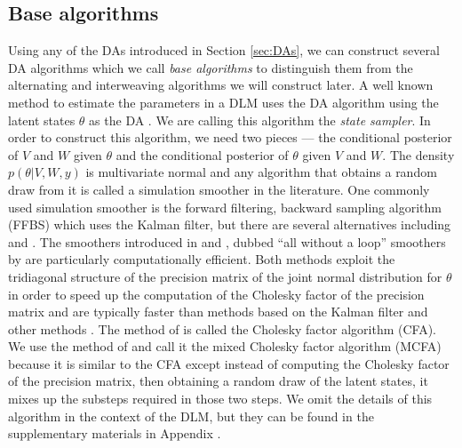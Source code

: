 \documentclass[12pt]{article}
\begin{document}
\subsection{Base algorithms}\label{sec:Algs:base}
Using any of the DAs introduced in Section \ref{sec:DAs}, we can construct several DA algorithms which we call {\it base algorithms} to distinguish them from the alternating and interweaving algorithms we will construct later. A well known method to estimate the parameters in a DLM uses the DA algorithm using the latent states $\theta$ as the DA \cite{fruhwirth1994data,carter1994gibbs}. We are calling this algorithm the {\it state sampler}. In order to construct this algorithm, we need two pieces --- the conditional posterior of $V$ and $W$ given $\theta$ and the conditional posterior of $\theta$ given $V$ and $W$. The density $p(\theta|V,W,y)$ is multivariate normal and any algorithm that obtains a random draw from it is called a simulation smoother in the literature. One commonly used simulation smoother is the forward filtering, backward sampling algorithm (FFBS) \cite{fruhwirth1994data,carter1994gibbs} which uses the Kalman filter, but there are several alternatives including \citet{koopman1993disturbance} and \citet{de1995simulation}. The smoothers introduced in \citet{mccausland2011simulation} and \citet{rue2001fast}, dubbed ``all without a loop'' smoothers by \citet{kastner2013ancillarity} are particularly computationally efficient. Both methods exploit the tridiagonal structure of the precision matrix of the joint normal distribution for $\theta$ in order to speed up the computation of the Cholesky factor of the precision matrix and are typically faster than methods based on the Kalman filter and other methods \cite{mccausland2011simulation}. The method of \citet{rue2001fast} is called the Cholesky factor algorithm (CFA). We use the method of \citet{mccausland2011simulation} and call it the mixed Cholesky factor algorithm (MCFA) because it is similar to the CFA except instead of computing the Cholesky factor of the precision matrix, then obtaining a random draw of the latent states, it mixes up the substeps required in those two steps. We omit the details of this algorithm in the context of the DLM, but they can be found in the supplementary materials in Appendix .
\end{document}
